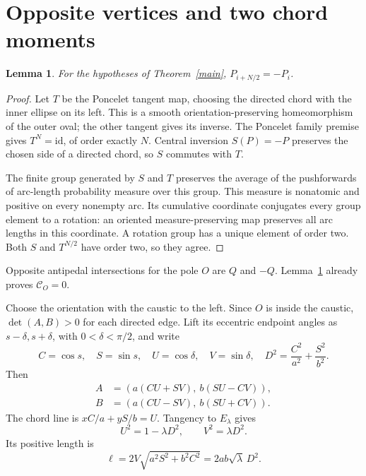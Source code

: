 \documentclass[11pt]{article}
\newtheorem{lemma}{Lemma}
\newcommand{\Cent}{\mathcal C}
\begin{document}
\section{Opposite vertices and two chord moments}
\begin{lemma}\label{central}
For the hypotheses of Theorem~\ref{main},
$P_{i+N/2}=-P_i$.
\end{lemma}
\begin{proof}
Let $T$ be the Poncelet tangent map, choosing the directed chord with
the inner ellipse on its left. This is a smooth orientation-preserving
homeomorphism of the outer oval; the other tangent gives its inverse.
The Poncelet family premise gives $T^N=\mathrm{id}$, of order exactly
$N$. Central inversion $S(P)=-P$ preserves the chosen side of a directed
chord, so $S$ commutes with $T$.

The finite group generated by $S$ and $T$ preserves the average of the
pushforwards of arc-length probability measure over this group. This
measure is nonatomic and positive on every nonempty arc. Its cumulative
coordinate conjugates every group element to a rotation: an oriented
measure-preserving map preserves all arc lengths in this coordinate.
A rotation group has a unique element of order two. Both $S$ and
$T^{N/2}$ have order two, so they agree.
\end{proof}
Opposite antipedal intersections for the pole $O$ are $Q$ and $-Q$.
Lemma~\ref{central} already proves $\Cent_O=0$.

Choose the orientation with the caustic to the left. Since $O$ is inside
the caustic, $\det(A,B)>0$ for each directed edge. Lift its eccentric
endpoint angles as $s-\delta,s+\delta$, with $0<\delta<\pi/2$, and write
\[
 C=\cos s,\quad S=\sin s,\quad U=\cos\delta,\quad V=\sin\delta,
 \quad D^2=\frac{C^2}{a^2}+\frac{S^2}{b^2}.
\]
Then
\begin{align*}
 A&=(a(CU+SV),\ b(SU-CV)),\\
 B&=(a(CU-SV),\ b(SU+CV)).
\end{align*}
The chord line is $xC/a+yS/b=U$. Tangency to $E_\lambda$ gives
\begin{equation}\label{tangent}
 U^2=1-\lambda D^2,\qquad V^2=\lambda D^2.
\end{equation}
Its positive length is
\begin{equation}\label{length}
 \ell=2V\sqrt{a^2S^2+b^2C^2}=2ab\sqrt\lambda\,D^2.
\end{equation}
\end{document}
